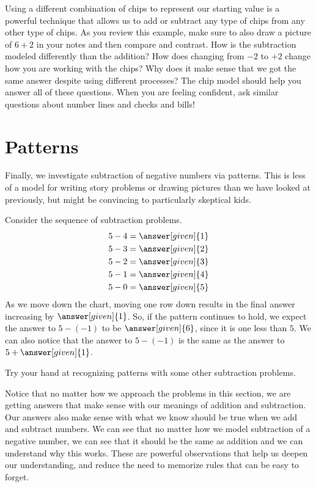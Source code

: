 \documentclass{ximera}
\begin{document}
Using a different combination of chips to represent our starting value is a powerful technique that allows us to add or subtract any type of chips from any other type of chips. As you review this example, make sure to also draw a picture of $6+2$ in your notes and then compare and contrast. How is the subtraction modeled differently than the addition? How does changing from $-2$ to $+2$ change how you are working with the chips? Why does it make sense that we got the same answer despite using different processes? The chip model should help you answer all of these questions. When you are feeling confident, ask similar questions about number lines and checks and bills!



\section{Patterns}


Finally, we investigate subtraction of negative numbers via patterns. This is less of a model for writing story problems or drawing pictures than we have looked at previously, but might be convincing to particularly skeptical kids.
\begin{example}
Consider the sequence of subtraction problems.
\begin{align*}
5 - 4 &= \answer[given]{1} \\
5 - 3 &= \answer[given]{2} \\
5 - 2 &= \answer[given]{3} \\
5 - 1 &= \answer[given]{4} \\
5 - 0 &= \answer[given]{5}
\end{align*}
As we move down the chart, moving one row down results in the final answer increasing by 
$\answer[given]{1}$.  So, if the pattern continues to hold, we expect the answer to 
$5 - (-1)$ to be $\answer[given]{6}$, since it is one less than $5$.  We can also notice that 
the answer to $5 - (-1)$ is the same as the answer to $5 + \answer[given]{1}$.
\end{example}
Try your hand at recognizing patterns with some other subtraction problems.

Notice that no matter how we approach the problems in this section, we are getting 
 answers that make sense with our meanings of addition and subtraction. Our answers 
 also make sense with what we know should be true when we add and subtract numbers.   
 We can see that no matter how we model subtraction of a negative number, we can 
see that it should be the same as addition and we can understand why this works. These 
are powerful observations that help us deepen our understanding, and reduce the need 
to memorize rules that can be easy to forget.
\end{document}
